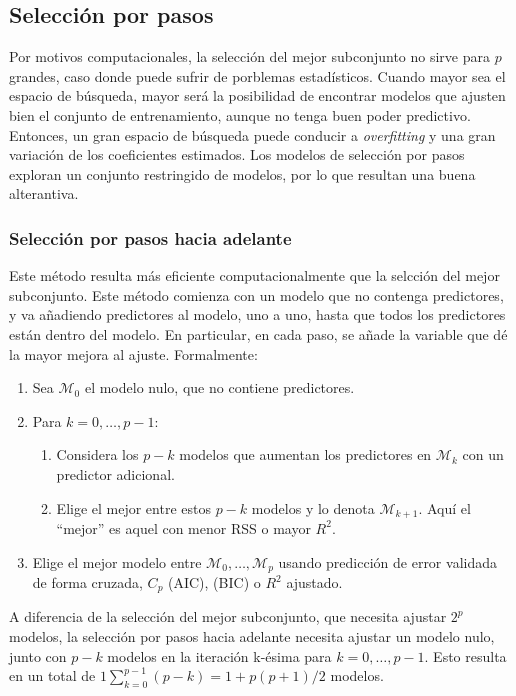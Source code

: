 \subsection{Selección por pasos}

Por motivos computacionales, la selección del mejor subconjunto no sirve para $p$ grandes, caso donde puede sufrir de porblemas estadísticos. Cuando mayor sea el espacio de búsqueda, mayor será la posibilidad de encontrar modelos que ajusten bien el conjunto de entrenamiento, aunque no tenga buen poder predictivo. Entonces, un gran espacio de búsqueda puede conducir a \textit{overfitting} y una gran variación de los coeficientes estimados. Los modelos de selección por pasos exploran un conjunto restringido de modelos, por lo que resultan una buena alterantiva. 

\subsubsection{Selección por pasos hacia adelante}

Este método resulta más eficiente computacionalmente que la selcción del mejor subconjunto. Este método comienza con un modelo que no contenga predictores, y va añadiendo predictores al modelo, uno a uno, hasta que todos los predictores están dentro del modelo. En particular, en cada paso, se añade la variable que dé la mayor mejora al ajuste. Formalmente:
\begin{enumerate}
\item Sea $\mathcal{M}_0$ el modelo nulo, que no contiene predictores.
\item Para $k = 0, \dots, p-1$:
\begin{enumerate}
\item Considera los $p-k$ modelos que aumentan los predictores en $\mathcal{M}_k$ con un predictor adicional.
\item Elige el mejor entre estos $p-k$ modelos y lo denota $\mathcal{M}_{k+1}$. Aquí el ``mejor'' es aquel con menor RSS o mayor $R^2$. 
\end{enumerate}
\item Elige el mejor modelo entre $\mathcal{M}_0, \dots, \mathcal{M}_p$ usando predicción de error validada de forma cruzada, $C_p$ (AIC), (BIC) o $R^2$ ajustado.
\end{enumerate}

A diferencia de la selección del mejor subconjunto, que necesita ajustar $2^p$ modelos, la selección por pasos hacia adelante necesita ajustar un modelo nulo, junto con $p-k$ modelos en la iteración k-ésima para $k = 0, \dots, p-1$. Esto resulta en un total de $1 \sum_{k=0}^{p-1}(p-k) = 1 + p(p+1)/2$ modelos. \\

